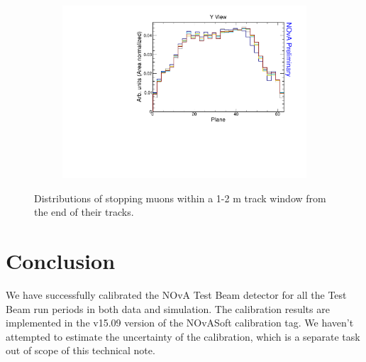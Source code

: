 \begin{figure}[ht!]
\begin{subfigure}{0.5\textwidth}
  \end{subfigure}
  \begin{subfigure}{0.5\textwidth}
    \includegraphics[width=\linewidth]{essentialsec_tb/nhits_plane_y.pdf}
  \end{subfigure}
    \caption{Distributions of stopping muons within a 1-2 m track window from the end of their tracks.}
  \label{fig:AbsCalibNHitsWCellPlane}
\end{figure}


\section{Conclusion}
We have successfully calibrated the NOvA Test Beam detector for all the Test Beam run periods in both data and simulation. The calibration results are implemented in the v15.09 version of the NOvASoft calibration tag. We haven't attempted to estimate the uncertainty of the calibration, which is a separate task out of scope of this technical note.